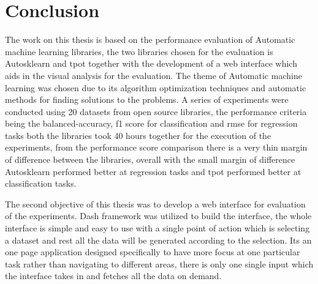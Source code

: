\chapter{Conclusion}\label{chap:conclusion}

The work on this thesis is based on the performance evaluation of Automatic machine learning libraries, the two libraries chosen for the evaluation is Autosklearn and tpot together with the development of a web interface which aids in the visual analysis for the evaluation. The theme of Automatic machine learning was chosen due to its algorithm optimization techniques and automatic methods for finding solutions to the problems. A series of experiments were conducted using 20 datasets from open source libraries, the performance criteria being the balanced-accuracy, f1 score for classification and rmse for regression tasks both the libraries took 40 hours together for the  execution of the experiments, from the performance score comparison there is a very thin margin of 
difference between the libraries, overall with the small margin of difference Autosklearn performed better at regression tasks and tpot performed better at classification tasks.

The second objective of this thesis was to develop a web interface for evaluation of the experiments. Dash framework was utilized to build the interface, the whole interface is simple and easy to use with a single point of action which is selecting a dataset and rest all the data will be generated according to the selection. Its an one page application designed specifically to have more focus at one particular task rather than navigating to different areas, there is only one single input which the interface takes in and fetches all the data on demand.
